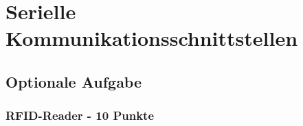 \section[Serielle Kommunikation]{Serielle Kommunikationsschnittstellen} \label{cpt:Kommunikation}

\subsection{Optionale Aufgabe}

\subsubsection{RFID-Reader - 10 Punkte}



\newpage
